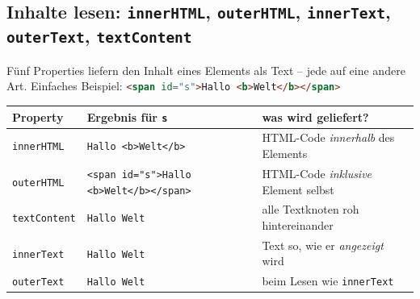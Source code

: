 \documentclass[a4paper,11pt]{article}
\begin{document}
\subsection{Inhalte lesen: \texttt{innerHTML}, \texttt{outerHTML}, \texttt{innerText}, \texttt{outerText}, \texttt{textContent}}\label{sec:inhalt}

Fünf Properties liefern den Inhalt eines Elements als Text -- jede auf eine andere Art. Einfaches Beispiel:
\lstinline[language=HTML]|<span id="s">Hallo <b>Welt</b></span>|

\begin{center}
\begin{tabular}{@{}lp{6.6cm}p{4.6cm}@{}}
\toprule
Property & Ergebnis für \texttt{s} & was wird geliefert?\\
\midrule
\texttt{innerHTML}   & \lstinline|Hallo <b>Welt</b>| & HTML-Code \emph{innerhalb} des Elements\\
\texttt{outerHTML}   & \lstinline|<span id="s">Hallo <b>Welt</b></span>| & HTML-Code \emph{inklusive} Element selbst\\
\texttt{textContent} & \lstinline|Hallo Welt| & alle Textknoten roh hintereinander\\
\texttt{innerText}   & \lstinline|Hallo Welt| & Text so, wie er \emph{angezeigt} wird\\
\texttt{outerText}   & \lstinline|Hallo Welt| & beim Lesen wie \texttt{innerText}\\
\bottomrule
\end{tabular}
\end{center}
\end{document}
